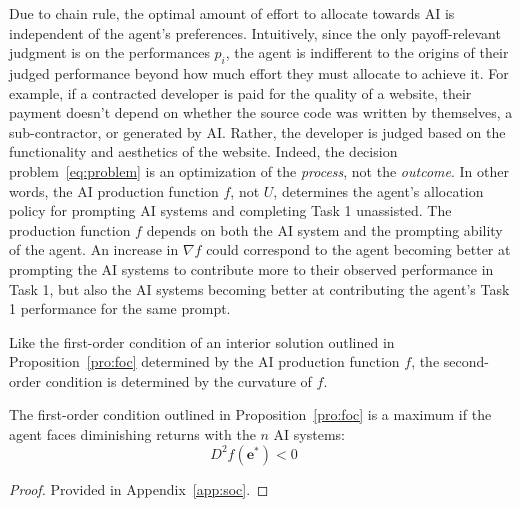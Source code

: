 Due to chain rule, the optimal amount of effort to allocate towards AI is independent of the agent's preferences. Intuitively, since the only payoff-relevant judgment is on the performances $p_i$, the agent is indifferent to the origins of their judged performance beyond how much effort they must allocate to achieve it. For example, if a contracted developer is paid for the quality of a website, their payment doesn't depend on whether the source code was written by themselves, a sub-contractor, or generated by AI. Rather, the developer is judged based on the functionality and aesthetics of the website. Indeed, the decision problem~\ref{eq:problem} is an optimization of the \textit{process}, not the \textit{outcome}. In other words, the AI production function $f$, not $U$, determines the agent's allocation policy for prompting AI systems and completing Task 1 unassisted. The production function $f$ depends on both the AI system and the prompting ability of the agent. An increase in $\nabla f$ could correspond to the agent becoming better at prompting the AI systems to contribute more to their observed performance in Task 1, but also the AI systems becoming better at contributing the agent's Task 1 performance for the same prompt.

Like the first-order condition of an interior solution outlined in Proposition~\ref{pro:foc} determined by the AI production function $f$, the second-order condition is determined by the curvature of $f$. 

\begin{proposition}
\label{pro:soc}
The first-order condition outlined in Proposition~\ref{pro:foc} is a maximum if the agent faces diminishing returns with the $n$ AI systems:
$$D^2f(\mathbf{e}^*)<0\quad$$
\end{proposition}
\begin{proof}
Provided in Appendix~\ref{app:soc}.
\end{proof}

